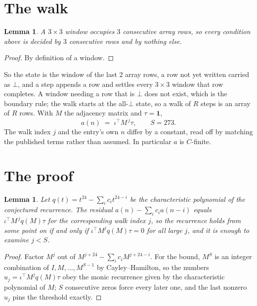 \documentclass[11pt,a4paper]{article}
\theoremstyle{plain}
\newtheorem{lemma}[theorem]{Lemma}
\theoremstyle{definition}
\begin{document}
\section{The walk}

\begin{lemma}\label{lem:win}
A $3\times3$ window occupies $3$ consecutive array rows, so every condition above is
decided by $3$ consecutive rows and by nothing else.
\end{lemma}

\begin{proof}
By definition of a window.
\end{proof}

So the state is the window of the last $2$ array rows, a row not yet written carried as
$\bot$, and a step appends a row and settles every $3\times3$ window that row completes. A
window needing a row that is $\bot$ does not exist, which is the boundary rule; the walk starts
at the all-$\bot$ state, so a walk of $R$ steps is an array of $R$ rows. With $M$ the adjacency
matrix and $\tau=\mathbf{1}$,
\[
a(n)\;=\;\iota^{\!\top}M^{\,j}\tau ,\qquad S=273.
\]
The walk index $j$ and the entry's own $n$ differ by a constant, read off by matching the
published terms rather than assumed. In particular $a$ is $C$-finite.

\section{The proof}

\begin{lemma}\label{lem:crit}
Let $q(t)=t^{24}-\sum_i c_it^{24-i}$ be the characteristic polynomial of the
conjectured recurrence. The residual $a(n)-\sum_ic_ia(n-i)$ equals
$\iota^{\!\top}M^{\,j}q(M)\tau$ for the corresponding walk index $j$, so the recurrence
holds from some point on if and only if $\iota^{\!\top}M^{j}q(M)\tau=0$ for all large $j$,
and it is enough to examine $j<S$.
\end{lemma}

\begin{proof}
Factor $M^{j}$ out of $M^{j+24}-\sum_ic_iM^{j+24-i}$. For the bound, $M^{S}$
is an integer combination of $I,M,\dots,M^{S-1}$ by Cayley--Hamilton, so the numbers
$u_j=\iota^{\!\top}M^{j}q(M)\tau$ obey the monic recurrence given by the characteristic
polynomial of $M$; $S$ consecutive zeros force every later one, and the last nonzero $u_j$
pins the threshold exactly.
\end{proof}
\end{document}
